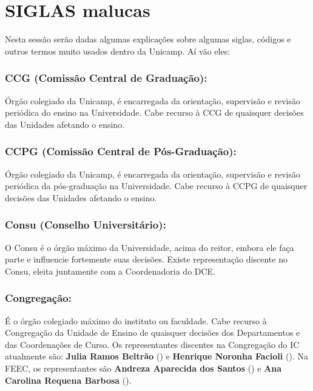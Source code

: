 
\section{SIGLAS malucas}

Nesta sessão serão dadas algumas explicações sobre algumas siglas, códigos e
outros termos muito usados dentro da Unicamp. Aí vão eles:

\subsubsection{CCG (Comissão Central de Graduação):} Órgão colegiado da Unicamp,
é encarregada da orientação, supervisão e revisão periódica do ensino na
Universidade. Cabe recurso à CCG de quaisquer decisões das Unidades afetando o
ensino.

\subsubsection{CCPG (Comissão Central de Pós-Graduação):} Órgão colegiado da
Unicamp, é encarregada da orientação, supervisão e revisão periódica da
pós-graduação na Universidade. Cabe recurso à CCPG de quaisquer decisões das
Unidades afetando o ensino.

\subsubsection{Consu (Conselho Universitário):} O Consu é o órgão máximo da
Universidade, acima do reitor, embora ele faça parte e influencie fortemente
suas decisões.  Existe representação discente no Consu, eleita juntamente com a
Coordenadoria do DCE.

\subsubsection{Congregação:} É o órgão colegiado máximo do instituto ou
faculdade.  Cabe recurso à Congregação da Unidade de Ensino de quaisquer
decisões dos Departamentos e das Coordenações de Curso. Os representantes
discentes na Congregação do IC atualmente são: \textbf{Julia Ramos Beltrão}
() e \textbf{Henrique Noronha Facioli}
(). Na FEEC, os representantes são
\textbf{Andreza Aparecida dos Santos} () e
\textbf{Ana Carolina Requena Barbosa} ().

